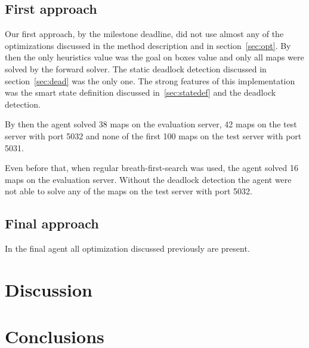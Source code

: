 \documentclass[a4paper,11pt]{article}
\begin{document}
\subsection{First approach}
Our first approach, by the milestone deadline, did not use almost any of the optimizations discussed in the method description and in section~\ref{sec:opt}.
By then the only heuristics value was the goal on boxes value and only all maps were solved by the forward solver. 
The static deadlock detection discussed in section~\ref{sec:dead} was the only one.
The strong features of this implementation was the smart state definition discussed in~\ref{sec:statedef} and the deadlock detection. 

By then the agent solved 38 maps on the evaluation server, 42 maps on the test server with port 5032 and none of the first 100 maps on the 
test server with port 5031. 

Even before that, when regular breath-first-search was used, the agent solved 16 maps on the evaluation server. 
Without the deadlock detection the agent were not able to solve any of the maps on the test server with port 5032.

\subsection{Final approach}

In the final agent all optimization discussed previously are present. 

\section{Discussion}

\section{Conclusions}
\end{document}
